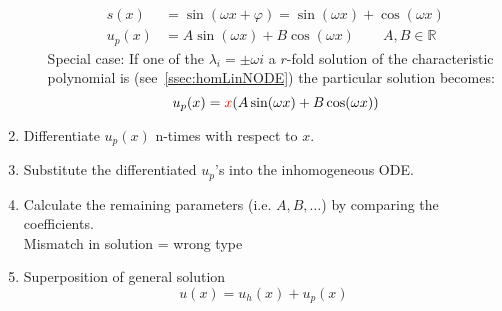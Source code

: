 \begin{enumerate}
\begin{enumerate}[label= (\roman*)]
                    \begin{align*}
                        s(x)   & = \sin(\omega x + \varphi) = \sin(\omega x) + \cos(\omega x)  \\
                        u_p(x) & =A\sin(\omega x) + B\cos(\omega x) \qquad  A,B \in \mathbb{R}
                    \end{align*}
                    Special case:
                    If one of the $\lambda_i = \pm \omega i$ a $r$-fold solution of the characteristic polynomial is (see~\ref{ssec:homLinNODE}) the particular solution becomes:
                    \begin{equation*}
                        u_p(x) = \textcolor{red}{x}(A\sin(\omega x) + B\cos(\omega x))
                    \end{equation*}
          \end{enumerate}
    \item Differentiate $u_p(x)$ n-times with respect to $x$.
    \item Substitute the differentiated $u_p$'s into the inhomogeneous ODE.
    \item Calculate the remaining parameters (i.e. $A, B, \ldots$) by comparing the coefficients.\\
          Mismatch in solution = wrong type
    \item Superposition of general solution
          \begin{equation*}
              u(x) = u_h(x) + u_p(x)
          \end{equation*}
\end{enumerate}

